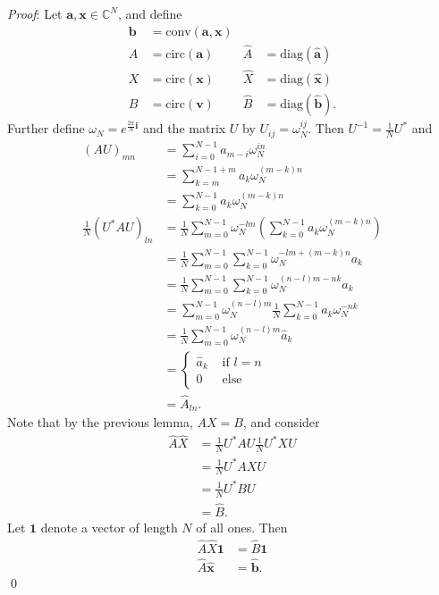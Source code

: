 \documentclass[12pt]{article}
\renewenvironment{proof}{\hspace{-4 ex} \emph{Proof}:}{\qed}
\newcommand{\CC}{\mathbb{C}}
\renewcommand{\vec}[1]{\boldsymbol{\mathbf{#1}}}
\begin{document}
\begin{proof}
	Let $\vec{a}, \vec{x} \in \CC^N$, and define
	\begin{align*}
		\vec{b} &= \text{conv}(\vec{a},\vec{x}) &&\\
		A &= \text{circ}(\vec{a}) & \hat{A} &= \text{diag}(\hat{\vec{a}}) \\
		X &= \text{circ}(\vec{x}) & \hat{X} &= \text{diag}(\hat{\vec{x}}) \\
		B &= \text{circ}(\vec{v}) & \hat{B} &= \text{diag}(\hat{\vec{b}}) \text{.}
	\end{align*}
	Further define $\omega_N = e^{\frac{2\pi}{N}\mathbf{i}}$ and the matrix $U$ by $U_{ij} = \omega_N^{ij}$. Then $U^{-1} = \frac{1}{N}U^{*}$ and 
	\begin{align*}
	(AU)_{mn} &= \sum\limits_{i=0}^{N-1}a_{m-i}\omega_N^{in} \\
	&= \sum\limits_{k=m}^{N-1+m}a_{k}\omega_N^{(m-k)n} \\
	&= \sum\limits_{k=0}^{N-1}a_{k}\omega_N^{(m-k)n} \\
	\frac{1}{N}(U^{*}AU)_{ln} &= \frac{1}{N} \sum\limits_{m=0}^{N-1} \omega_N^{-lm} \left( \sum\limits_{k=0}^{N-1}a_{k}\omega_N^{(m-k)n} \right) \\
	&= \frac{1}{N} \sum\limits_{m=0}^{N-1}\sum\limits_{k=0}^{N-1} \omega_N^{-lm + (m-k)n} a_{k} \\
	&= \frac{1}{N} \sum\limits_{m=0}^{N-1}\sum\limits_{k=0}^{N-1} \omega_N^{(n-l)m -nk} a_{k} \\
	&= \sum\limits_{m=0}^{N-1} \omega_N^{(n-l)m} \frac{1}{N} \sum\limits_{k=0}^{N-1} a_{k}\omega_N^{-nk}  \\
	& = \frac{1}{N}\sum\limits_{m=0}^{N-1} \omega_N^{(n-l)m} \hat{a}_k \\
	& = \begin{cases}
			\hat{a}_k & \text{ if } l=n \\
					0 & \text{ else}
		\end{cases} \\
	&= \hat{A}_{ln} \text{.}
	\end{align*}
	Note that by the previous lemma, $AX = B$, and consider
	\begin{align*}
		\hat{A}\hat{X} & = \frac{1}{N}U^{*}AU \frac{1}{N}U^{*}XU \\
		& = \frac{1}{N}U^{*}AXU \\
		& = \frac{1}{N}U^{*}BU \\
		& = \hat{B} \text{.}
	\end{align*}
	Let $\vec{1}$ denote a vector of length $N$ of all ones. Then
	\begin{align*}
	\hat{A}\hat{X} \vec{1} &= \hat{B} \vec{1} \\
	\hat{A}\hat{\vec{x}} &= \hat{\vec{b}} \text{.}
	\end{align*}
\end{proof}
\end{document}
